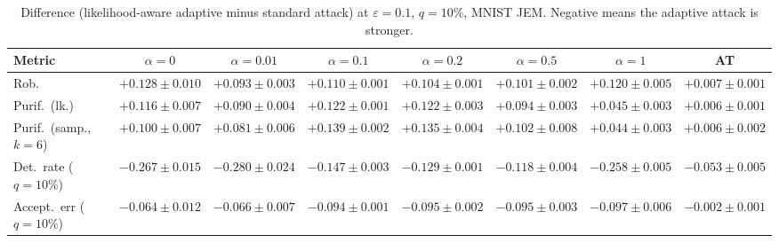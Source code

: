 \begin{table}[htbp]
  \centering
  \begin{tabular}{lccccccc}
    \toprule
    Metric & $\alpha{=}0$ & $\alpha{=}0.01$ & $\alpha{=}0.1$ & $\alpha{=}0.2$ & $\alpha{=}0.5$ & $\alpha{=}1$ & AT \\
    \midrule
    Rob. & $+0.128 \pm 0.010$ & $+0.093 \pm 0.003$ & $+0.110 \pm 0.001$ & $+0.104 \pm 0.001$ & $+0.101 \pm 0.002$ & $+0.120 \pm 0.005$ & $+0.007 \pm 0.001$ \\
    Purif.\ (lk.) & $+0.116 \pm 0.007$ & $+0.090 \pm 0.004$ & $+0.122 \pm 0.001$ & $+0.122 \pm 0.003$ & $+0.094 \pm 0.003$ & $+0.045 \pm 0.003$ & $+0.006 \pm 0.001$ \\
    Purif.\ (samp., $k{=}6$) & $+0.100 \pm 0.007$ & $+0.081 \pm 0.006$ & $+0.139 \pm 0.002$ & $+0.135 \pm 0.004$ & $+0.102 \pm 0.008$ & $+0.044 \pm 0.003$ & $+0.006 \pm 0.002$ \\
    Det.\ rate ($q{=}10\%$) & $-0.267 \pm 0.015$ & $-0.280 \pm 0.024$ & $-0.147 \pm 0.003$ & $-0.129 \pm 0.001$ & $-0.118 \pm 0.004$ & $-0.258 \pm 0.005$ & $-0.053 \pm 0.005$ \\
    Accept.\ err ($q{=}10\%$) & $-0.064 \pm 0.012$ & $-0.066 \pm 0.007$ & $-0.094 \pm 0.001$ & $-0.095 \pm 0.002$ & $-0.095 \pm 0.003$ & $-0.097 \pm 0.006$ & $-0.002 \pm 0.001$ \\
    \bottomrule
  \end{tabular}
  \caption{Difference (likelihood-aware adaptive minus standard attack) at $\varepsilon=0.1$, $q=10\%$, MNIST JEM. Negative means the adaptive attack is stronger.}
  \label{tab:joint_vs_normal_jem_eps0.1}
\end{table}
